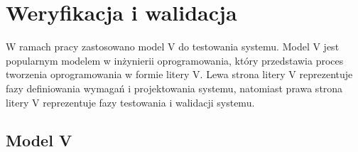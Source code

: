 \documentclass[a4paper,twoside,12pt]{book}
\begin{document}


%      

%      




\chapter{Weryfikacja i walidacja}
W ramach pracy zastosowano model V do testowania systemu. Model V jest popularnym modelem w inżynierii oprogramowania, który przedstawia proces tworzenia oprogramowania w formie litery V. Lewa strona litery V reprezentuje fazy definiowania wymagań i projektowania systemu, natomiast prawa strona litery V reprezentuje fazy testowania i walidacji systemu. 

\section{Model V}
\end{document}

